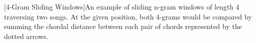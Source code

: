[4-Gram Sliding Windows]An example of sliding n-gram windows of length 4 traversing two songs. At the given position, both 4-grams would be compared by summing the chordal distance between each pair of chords represented by the dotted arrows.